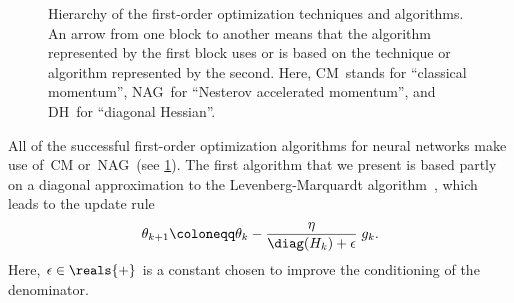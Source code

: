 \documentclass[11pt,a4paper]{article}
\numberwithin{equation}{section}
\begin{document}
\begin{figure}[t]
\centering
{}
\caption{Hierarchy of the first-order optimization techniques and algorithms.
An arrow from one block to another means that the algorithm represented by the
first block uses or is based on the technique or algorithm represented by the
second. Here, CM~stands for ``classical momentum'', NAG~for ``Nesterov
accelerated momentum'', and DH~for ``diagonal
Hessian''.\label{fig:first_order_hierarchy}}
\end{figure}

All of the successful first-order optimization algorithms for neural networks
make use of~CM or~NAG~(see \ref{fig:first_order_hierarchy}). The first algorithm
that we present is based partly on a diagonal approximation to the
Levenberg-Marquardt algorithm~\citet{becker-lecun-89}, which leads to the update
rule
\begin{align*}
	\theta_{k + 1} \coloneqq \theta_k - \frac{\eta}{\diag(H_k) + \epsilon} \;g_k.
\end{align*}
Here, $\epsilon \in \reals{+}$ is a constant chosen to improve the conditioning
of the denominator.
\end{document}
